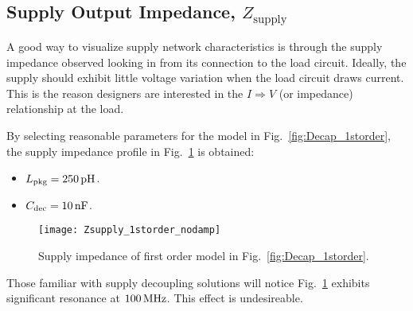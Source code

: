 \subsection{Supply Output Impedance, $Z_\mathrm{supply}$}
\par A good way to visualize supply network characteristics is through the
supply impedance observed looking in from its connection to the load circuit.
Ideally, the supply should exhibit little voltage variation when the load
circuit draws current. This is the reason designers are interested in the
$I{\Rightarrow}V$ (or impedance) relationship at the load.
%
\par\noindent By selecting reasonable parameters for the model in
Fig.~\ref{fig:Decap_1storder}, the supply impedance profile in
Fig.~\ref{fig:Zsupply_1storder_nodamp} is obtained:
%
\begin{itemize}[noitemsep]
\item $L_\mathrm{pkg}=250\mathrm{\,pH}$.
\item $C_\mathrm{dec}=10\mathrm{\,nF}$.
\end{itemize}
%
\begin{figure}[!ht]
	\centering
	\texttt{[image: Zsupply\_1storder\_nodamp]}
	\caption{Supply impedance of first order model in Fig.~\ref{fig:Decap_1storder}.}
\label{fig:Zsupply_1storder_nodamp}%
\end{figure}
%
\par Those familiar with supply decoupling solutions will notice
Fig.~\ref{fig:Zsupply_1storder_nodamp} exhibits significant resonance at
$100\mathrm{\,MHz}$. This effect is undesireable.
%
